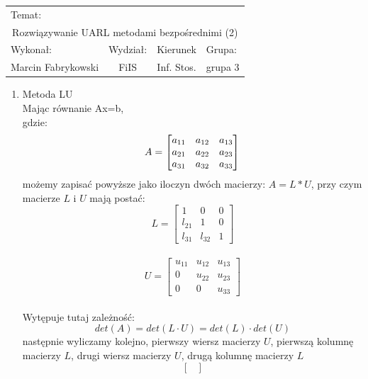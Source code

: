 \documentclass[12pt,a4paper]{article}
\begin{document}
 
\large
\begin{tabular}{|c|c|c|c|}
\hline
\multicolumn{4}{|l|}{Temat:}\\
\multicolumn{4}{|c|}{Rozwiązywanie UARL metodami bezpośrednimi (2)}\\
\hline
\multicolumn{1}{|l}{Wykonał:}&\multicolumn{1}{|l}{Wydział:}&\multicolumn{1}{|c}{Kierunek}&\multicolumn{1}{|l|}{Grupa:}\\
Marcin Fabrykowski&FiIS&Inf. Stos.&grupa 3\\
\hline
\end{tabular}
\normalsize
\vspace{2cm}
\begin{enumerate}
\item Metoda LU\\
Mając równanie Ax=b,\\
gdzie:
\begin{equation}
A=\begin{bmatrix}
a_{11}&a_{12}&a_{13}\\
a_{21}&a_{22}&a_{23}\\
a_{31}&a_{32}&a_{33}
\end{bmatrix}\\
\end{equation}
możemy zapisać powyższe jako iloczyn dwóch macierzy: $A=L*U$, przy czym macierze $L$ i $U$ mają postać:
\begin{equation}
L=
\begin{bmatrix}
1&0&0\\
l_{21}&1&0\\
l_{31}&l_{32}&1
\end{bmatrix}
\end{equation}\\
\begin{equation}
U=
\begin{bmatrix}
u_{11}&u_{12}&u_{13}\\
0&u_{22}&u_{23}\\
0&0&u_{33}
\end{bmatrix}
\end{equation}\\
Wytępuje tutaj zależność:
\begin{equation}
det(A)=det(L\cdot U)=det(L)\cdot det(U)
\end{equation}
następnie wyliczamy kolejno, pierwszy wiersz macierzy $U$, pierwszą kolumnę macierzy $L$, drugi wiersz macierzy $U$, drugą kolumnę macierzy $L$\\
\begin{equation}
\begin{bmatrix}

\end{bmatrix}
\end{equation}
\end{enumerate}
\end{document}

